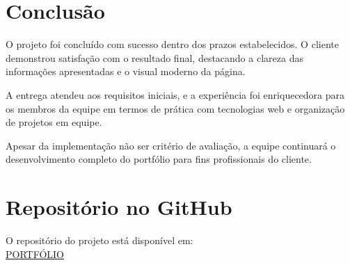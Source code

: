 \documentclass[12pt]{article}
\begin{document}
\section{Conclusão}

O projeto foi concluído com sucesso dentro dos prazos estabelecidos. O cliente demonstrou satisfação com o resultado final, destacando a clareza das informações apresentadas e o visual moderno da página.

A entrega atendeu aos requisitos iniciais, e a experiência foi enriquecedora para os membros da equipe em termos de prática com tecnologias web e organização de projetos em equipe.

Apesar da implementação não ser critério de avaliação, a equipe continuará o desenvolvimento completo do portfólio para fins profissionais do cliente.

\section{Repositório no GitHub}

O repositório do projeto está disponível em:\\\href{https://github.com/JuanJASP/repositoriofinalcliente.git}{PORTFÓLIO}
\end{document}
